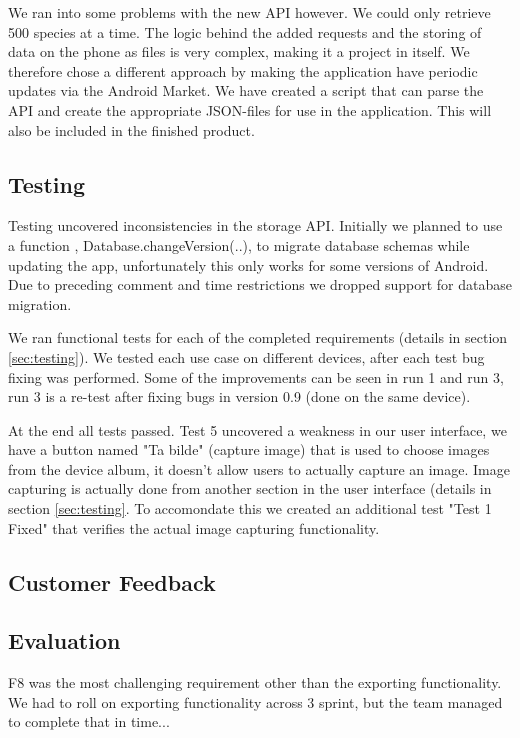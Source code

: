   We ran into some problems with the new API however. We could only retrieve 500 species at a time. The logic behind the added requests and the storing of data on the phone as files is very complex, making it a project in itself. We therefore chose a different approach by making the application have periodic updates via the Android Market. We have created a script that can parse the API and create the appropriate JSON-files for use in the application. This will also be included in the finished product. 

\subsection{Testing}

Testing uncovered inconsistencies in the storage API. Initially we planned to
use a function , Database.changeVersion(..), to migrate database schemas while
updating the app, unfortunately this only works for some versions of Android.
Due to preceding comment and time restrictions we dropped support for database
migration.

We ran functional tests for each of the completed requirements (details in
section \ref{sec:testing}). We tested each use case on different devices, after
each test bug fixing was performed. Some of the improvements can be seen in run
1 and run 3, run 3 is a re-test after fixing bugs in version 0.9 (done on the
same device). 

At the end all tests passed. Test 5 uncovered a weakness in our user interface,
we have a button named "Ta bilde" (capture image) that is used to choose images
from the device album, it doesn't allow users to actually capture an image.
Image capturing is actually done from another section in the user interface
(details in section \ref{sec:testing}. To accomondate this we created an
additional test "Test 1 Fixed" that verifies the actual image capturing
functionality.

\subsection{Customer Feedback}

\subsection{Evaluation}

F8 was the most challenging requirement other than the exporting functionality.
We had to roll on exporting functionality across 3 sprint, but the team managed
to complete that in time...
